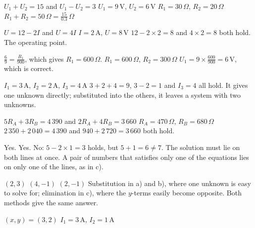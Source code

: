 \begin{facit}
  $U_1 + U_2 = 15$ and $U_1 - U_2 = 3$
 $U_1 = 9\,\text{V}$, $U_2 = 6\,\text{V}$
 $R_1 = 30\,\Omega$, $R_2 = 20\,\Omega$
 $R_1 + R_2 = 50\,\Omega = \frac{15}{0.3}\,\Omega$

  $U = 12 - 2I$ and $U = 4I$
 $I = 2\,\text{A}$, $U = 8\,\text{V}$
 $12 - 2 \times 2 = 8$ and $4 \times 2 = 8$ both hold.
 The operating point.

  $\frac{6}{9} = \frac{R_1}{900}$, which gives $R_1 = 600\,\Omega$.
 $R_1 = 600\,\Omega$, $R_2 = 300\,\Omega$
 $U_1 = 9 \times \frac{600}{900} = 6\,\text{V}$, which is correct.

  $I_1 = 3\,\text{A}$, $I_2 = 2\,\text{A}$, $I_3 = 4\,\text{A}$
 $3 + 2 + 4 = 9$, $3 - 2 = 1$ and $I_3 = 4$ all hold.
 It gives one unknown directly; substituted into the others, it leaves a system with two
unknowns.

  $5R_A + 3R_B = 4\,390$ and $2R_A + 4R_B = 3\,660$
 $R_A = 470\,\Omega$, $R_B = 680\,\Omega$
 $2\,350 + 2\,040 = 4\,390$ and $940 + 2\,720 = 3\,660$ both hold.

  Yes.  Yes.  No: $5 - 2 \times 1 = 3$ holds, but
$5 + 1 = 6 \neq 7$.
 The solution must lie on both lines at once. A pair of numbers that satisfies only one of
the equations lies on only one of the lines, as in c).

  $(2, 3)$  $(4, -1)$  $(2, -1)$
 Substitution in a) and b), where one unknown is easy to solve for; elimination in c), where
the $y$-terms easily become opposite. Both methods give the same answer.

  $(x, y) = (3, 2)$
 $I_1 = 3\,\text{A}$, $I_2 = 1\,\text{A}$

\end{facit}

